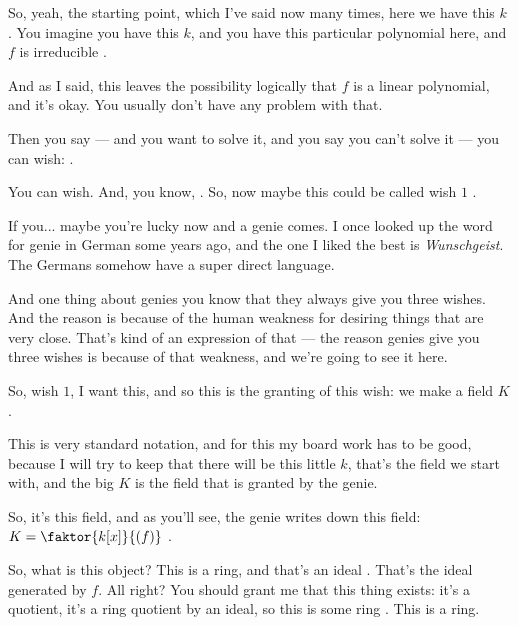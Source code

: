 \begin{speech}[01:00:02 - 01:01:34]
So, yeah, the starting point, which I've said now many times, here we have this $k$ . You imagine you have this $k$, and you have this particular polynomial here, and $f$ is irreducible .

And as I said, this leaves the possibility logically that $f$ is a linear polynomial, and it's okay. You usually don't have any problem with that.

Then you say --- and you want to solve it, and you say you can't solve it --- you can wish:  .

You can wish. And, you know, . So, now maybe this could be called wish $1$ .

If you... maybe you're lucky now and a genie comes. I once looked up the word for genie in German some years ago, and the one I liked the best is \emph{Wunschgeist}. The Germans somehow have a super direct language.

And one thing about genies you know that they always give you three wishes. And the reason is because of the human weakness for desiring things that are very close. That's kind of an expression of that --- the reason genies give you three wishes is because of that weakness, and we're going to see it here.
\end{speech}

\begin{speech}[01:01:34 - 01:02:36]
So, wish $1$, I want this, and so this is the granting of this wish: we make a field $K$ .

This is very standard notation, and for this my board work has to be good, because I will try to keep that there will be this little $k$, that's the field we start with, and the big $K$ is the field that is granted by the genie.

So, it's this field, and as you'll see, the genie writes down this field: $K = \faktor{k[x]}{(f)}$ .

So, what is this object? This is a ring, and that's an ideal . That's the ideal generated by $f$. All right? You should grant me that this thing exists: it's a quotient, it's a ring quotient by an ideal, so this is some ring . This is a ring.
\end{speech}

